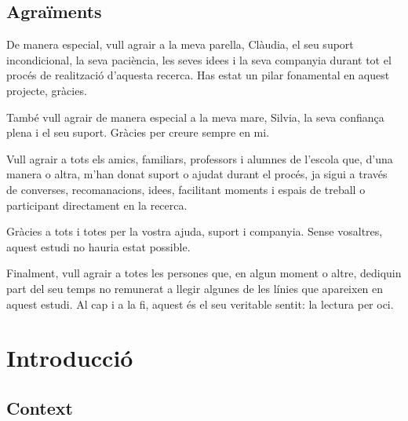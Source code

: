 \documentclass[12pt]{article}
\newif\ifstartwithtitle
\newcommand{\subsectiononumber}[1]{%
  \subsection*{#1}
  \phantomsection
}
\begin{document}
\newpage
\subsectiononumber{Agraïments}
De manera especial, vull agrair a la meva parella, Clàudia, el seu suport incondicional, la seva paciència, les seves idees i la seva companyia durant tot el procés de realització d'aquesta recerca. Has estat un pilar fonamental en aquest projecte, gràcies.

També vull agrair de manera especial a la meva mare, Silvia, la seva confiança plena i el seu suport. Gràcies per creure sempre en mi.

Vull agrair a tots els amics, familiars, professors i alumnes de l'escola que, d'una manera o altra, m'han donat suport o ajudat durant el procés, ja sigui a través de converses, recomanacions, idees, facilitant moments i espais de treball o participant directament en la recerca.

Gràcies a tots i totes per la vostra ajuda, suport i companyia. Sense vosaltres, aquest estudi no hauria estat possible.

Finalment, vull agrair a totes les persones que, en algun moment o altre, dediquin part del seu temps no remunerat a llegir algunes de les línies que apareixen en aquest estudi. Al cap i a la fi, aquest és el seu veritable sentit: la lectura per oci.

\newpage
\tableofcontents
\newpage
\listoffigures
\newpage
\listoftables
\newpage


\newpage
\section{Introducció}
\label{intro}

\subsection{Context}
\end{document}
